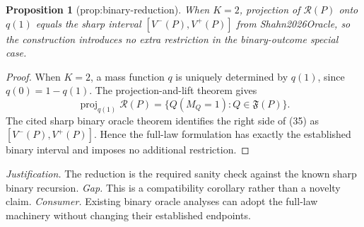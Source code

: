 \documentclass{article}
\newtheorem{proposition}{Proposition}
\begin{document}
\begin{proposition}[prop:binary-reduction]\label{prop:binary-reduction}
When \(K=2\), projection of \(\mathcal R(P)\) onto \(q(1)\) equals the sharp interval \([V^-(P),V^+(P)]\) from Shahn2026Oracle, so the construction introduces no extra restriction in the binary-outcome special case.
\end{proposition}
\begin{proof}
When \(K=2\), a mass function \(q\) is uniquely determined by \(q(1)\), since \(q(0)=1-q(1)\).  The projection-and-lift theorem gives
\[
 \operatorname{proj}_{q(1)}\mathcal R(P)
 =\{Q(M_Q=1):Q\in\mathfrak F(P)\}.                       \tag{35}
\]
The cited sharp binary oracle theorem identifies the right side of (35) as \([V^-(P),V^+(P)]\).  Hence the full-law formulation has exactly the established binary interval and imposes no additional restriction.
\end{proof}
\par\smallskip\noindent \textit{Justification.} The reduction is the required sanity check against the known sharp binary recursion. \textit{Gap.} This is a compatibility corollary rather than a novelty claim. \textit{Consumer.} Existing binary oracle analyses can adopt the full-law machinery without changing their established endpoints.
\end{document}
